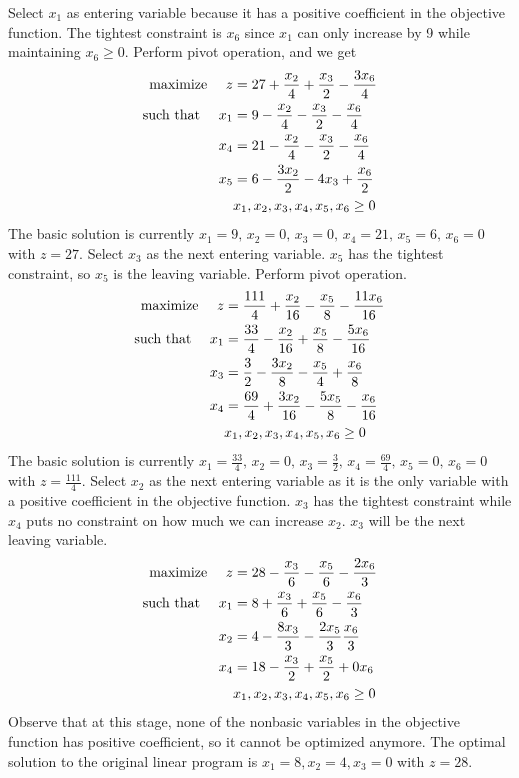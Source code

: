 Select $x_1$ as entering variable because it has a positive coefficient in the objective function. The tightest constraint is $x_6$ since $x_1$ can only increase by 9 while maintaining $x_6 \geq 0$. Perform pivot operation, and we get
\[
    \begin{aligned}
        \text{maximize \quad }  z &= 27 + \frac{x_2}{4} + \frac{x_3}{2} - \frac{3x_6}{4} \\
        \text{such that \quad } x_1 &= 9 - \frac{x_2}{4} - \frac{x_3}{2} - \frac{x_6}{4} \\
        x_4 &= 21 - \frac{x_2}{4} - \frac{x_3}{2} - \frac{x_6}{4} \\
        x_5 &= 6 - \frac{3x_2}{2} - 4x_3 + \frac{x_6}{2} \\
        & x_1, x_2, x_3, x_4, x_5, x_6 \geq 0
    \end{aligned}
\]
The basic solution is currently $x_1=9,\,x_2=0,\,x_3=0,\,x_4=21,\,x_5=6,\,x_6=0$ with $z=27$. Select $x_3$ as the next entering variable. $x_5$ has the tightest constraint, so $x_5$ is the leaving variable. Perform pivot operation.
\[
    \begin{aligned}
        \text{maximize \quad }  z &= \frac{111}{4} + \frac{x_2}{16} - \frac{x_5}{8} - \frac{11x_6}{16} \\
        \text{such that \quad } x_1 &= \frac{33}{4} - \frac{x_2}{16} + \frac{x_5}{8} - \frac{5x_6}{16} \\
        x_3 &= \frac{3}{2} - \frac{3x_2}{8} - \frac{x_5}{4} + \frac{x_6}{8} \\
        x_4 &= \frac{69}{4} + \frac{3x_2}{16} - \frac{5x_5}{8} - \frac{x_6}{16} \\
        & x_1, x_2, x_3, x_4, x_5, x_6 \geq 0
    \end{aligned}
\]
The basic solution is currently $x_1=\frac{33}{4},\,x_2=0,\,x_3=\frac{3}{2},\,x_4=\frac{69}{4},\,x_5=0,\,x_6=0$ with $z=\frac{111}{4}$. Select $x_2$ as the next entering variable as it is the only variable with a positive coefficient in the objective function. $x_3$ has the tightest constraint while $x_4$ puts no constraint on how much we can increase $x_2$. $x_3$ will be the next leaving variable.
\[
    \begin{aligned}
        \text{maximize \quad }  z &= 28 - \frac{x_3}{6} - \frac{x_5}{6} - \frac{2x_6}{3} \\
        \text{such that \quad } x_1 &= 8 + \frac{x_3}{6} + \frac{x_5}{6} - \frac{x_6}{3} \\
        x_2 &= 4 - \frac{8x_3}{3} - \frac{2x_5}{3} \frac{x_6}{3} \\
        x_4 &= 18 - \frac{x_3}{2} + \frac{x_5}{2} + 0x_6 \\
        & x_1, x_2, x_3, x_4, x_5, x_6 \geq 0
    \end{aligned}
\]
Observe that at this stage, none of the nonbasic variables in the objective function has positive coefficient, so it cannot be optimized anymore. The optimal solution to the original linear program is $x_1=8,x_2=4,x_3=0$ with $z=28$.

